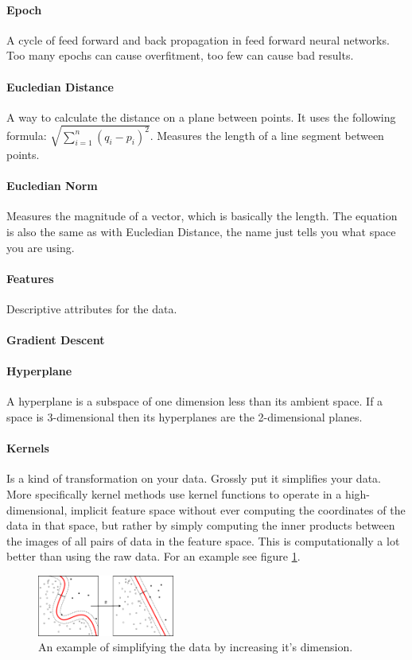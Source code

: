 \paragraph{Epoch} A cycle of feed forward and back propagation in feed forward neural networks. Too many epochs can cause overfitment, too few can cause bad results.

\paragraph{Eucledian Distance}
A way to calculate the distance on a plane between points. It uses the following formula: $\sqrt{\sum\limits_{i=1}^n (q_{i} - p_{i})^2}$. Measures the length of a line segment between points.

\paragraph{Eucledian Norm}
Measures the magnitude of a vector, which is basically the length. The equation is also the same as with Eucledian Distance, the name just tells you what space you are using.

\paragraph{Features} 
Descriptive attributes for the data.

\paragraph{Gradient Descent}

\paragraph{Hyperplane}
A hyperplane is a subspace of one dimension less than its ambient space. If a space is 3-dimensional then its hyperplanes are the 2-dimensional planes.

\paragraph{Kernels} 
Is a kind of transformation on your data. Grossly put it simplifies your data. More specifically kernel methods use kernel functions to operate in a high-dimensional, implicit feature space without ever computing the coordinates of the data in that space, but rather by simply computing the inner products between the images of all pairs of data in the feature space. This is computationally a lot better than using the raw data. For an example see figure \ref{fig:kernelmethods}.
\begin{figure}
\centering
\includegraphics[width=0.4\textwidth]{images/kernelmethod.png}
\caption{\label{fig:kernelmethods} An example of simplifying the data by increasing it's dimension.}
\end{figure}

